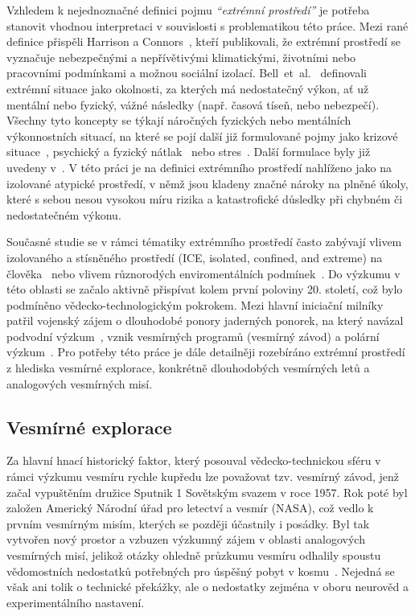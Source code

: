 Vzhledem k nejednoznačné definici pojmu \textit{\enquote{extrémní prostředí}} je
potřeba stanovit vhodnou interpretaci v souvislosti s problematikou této práce.
Mezi rané definice přispěli Harrison a Connors~\cite{harrison1984}, kteří
publikovali, že extrémní prostředí se vyznačuje nebezpečnými a nepřívětivými
klimatickými, životními nebo pracovními podmínkami a možnou sociální izolací.
Bell~et~al.~\cite{bell2016} definovali extrémní situace jako okolnosti, za
kterých má nedostatečný výkon, ať už mentální nebo fyzický, vážné následky
(např. časová tíseň, nebo nebezpečí). Všechny tyto koncepty se týkají náročných
fyzických nebo mentálních výkonnostních situací, na které se pojí další již
formulované pojmy jako krizové
situace~\cite{stachowski2009benefits,yu2008misery}, psychický a fyzický
nátlak~\cite{gardner2012performance} nebo stres~\cite{Staal2013StressCA}. Další
formulace byly již uvedeny
v~\cite{hannah2009framework,hallgren2018matter,golden2018teams}. V této práci je
na definici extrémního prostředí nahlíženo jako na izolované atypické prostředí,
v němž jsou kladeny značné nároky na plněné úkoly, které s sebou nesou vysokou
míru rizika a katastrofické důsledky při chybném či nedostatečném výkonu.

Současné studie se v rámci tématiky extrémního prostředí často zabývají vlivem
izolovaného a stísněného prostředí (\gls{ICE}, isolated, confined, and extreme)
na člověka~\cite{Pagel2016,golden2018teams} nebo vlivem různorodých
enviromentálních podmínek~\cite{Taylor2016,Winnard2019,Zhang2019}. Do výzkumu v
této oblasti se začalo aktivně přispívat kolem první poloviny 20. století, což
bylo podmíněno vědecko-technologickým pokrokem. Mezi hlavní iniciační milníky
patřil vojenský zájem o dlouhodobé ponory jaderných ponorek, na který navázal
podvodní výzkum~\cite{Maynard2018,Driskell2018}, vznik vesmírných programů
(vesmírný závod) a polární výzkum~\cite{wickman2008,stuster2007bold}. Pro
potřeby této práce je dále detailněji rozebíráno extrémní prostředí z hlediska
vesmírné explorace, konkrétně dlouhodobých vesmírných letů a analogových
vesmírných misí.

\subsection{Vesmírné explorace}
\label{subsection:vesmirne_explorace}
Za hlavní hnací historický faktor, který posouval vědecko-technickou sféru v
rámci výzkumu vesmíru rychle kupředu lze považovat tzv. vesmírný závod, jenž
začal vypuštěním družice Sputnik 1 Sovětským svazem v roce 1957. Rok poté byl
založen Americký Národní úřad pro letectví a vesmír (\gls{NASA}), což vedlo k
prvním vesmírným misím, kterých se později účastnily i posádky. Byl tak vytvořen
nový prostor a vzbuzen výzkumný zájem v oblasti analogových vesmírných misí,
jelikož otázky ohledně průzkumu vesmíru odhalily spoustu vědomostních nedostatků
potřebných pro úspěšný pobyt v kosmu~\cite{Driskell2018}. Nejedná se však ani
tolik o technické překážky, ale o nedostatky zejména v oboru neurověd a
experimentálního nastavení.

